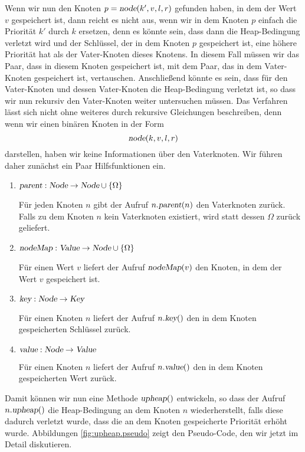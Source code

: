 Wenn wir nun den Knoten $p = \textsl{node}(k',v,l,r)$ gefunden haben, in dem der Wert $v$
gespeichert ist, dann reicht es nicht aus, wenn wir in dem Knoten $p$ einfach die Priorit\"at $k'$
durch $k$ ersetzen, denn es k\"onnte sein, dass dann die Heap-Bedingung verletzt wird und
der Schl\"ussel, der in dem Knoten $p$ gespeichert ist, eine h\"ohere Priorit\"at hat als der
Vater-Knoten dieses Knotens.  In diesem Fall m\"ussen wir das Paar, dass in diesem Knoten
gespeichert ist, mit dem Paar, das in dem Vater-Knoten gespeichert ist, vertauschen.
Anschlie{\ss}end k\"onnte es sein, dass f\"ur den Vater-Knoten und dessen Vater-Knoten die
Heap-Bedingung verletzt ist, so dass wir nun rekursiv den Vater-Knoten weiter untersuchen
m\"ussen.  Das Verfahren l\"asst sich nicht ohne weiteres durch rekursive Gleichungen
beschreiben, denn wenn wir einen bin\"aren Knoten in der Form
\[ \textsl{node}(k,v,l,r) \]
darstellen, haben wir keine Informationen \"uber den Vaterknoten.  Wir f\"uhren daher zun\"achst
ein Paar Hilfsfunktionen ein.
\begin{enumerate}
\item $\textsl{parent}: \textsl{Node} \rightarrow \textsl{Node} \cup \{ \Omega \}$

      F\"ur jeden Knoten $n$ gibt der Aufruf $n.\textsl{parent}(n)$ den Vaterknoten zur\"uck.
      Falls zu dem Knoten $n$ kein Vaterknoten existiert, wird statt dessen $\Omega$
      zur\"uck geliefert.
\item $\textsl{nodeMap}: \textsl{Value} \rightarrow \textsl{Node} \cup \{ \Omega \}$

      F\"ur einen Wert $v$ liefert der Aufruf $\textsl{nodeMap}(v)$ den Knoten, in dem der Wert
      $v$ gespeichert ist.
\item $\textsl{key}: \textsl{Node} \rightarrow \textsl{Key}$

      F\"ur einen Knoten $n$ liefert der Aufruf $n.\textsl{key}()$ den in dem Knoten
      gespeicherten Schl\"ussel zur\"uck.

\item $\textsl{value}: \textsl{Node} \rightarrow \textsl{Value}$

      F\"ur einen Knoten $n$ liefert der Aufruf $n.\textsl{value}()$ den in dem Knoten
      gespeicherten Wert zur\"uck.
\end{enumerate}
Damit k\"onnen wir nun eine Methode $\textsl{upheap}()$ entwickeln, so dass der Aufruf
$n.\textsl{upheap}()$ die Heap-Bedingung an dem Knoten $n$ wiederherstellt, falls diese
dadurch verletzt wurde, dass die an dem Knoten gespeicherte Priorit\"at erh\"oht wurde.
Abbildungen \ref{fig:upheap.pseudo} zeigt den Pseudo-Code, den wir jetzt im Detail diskutieren.

